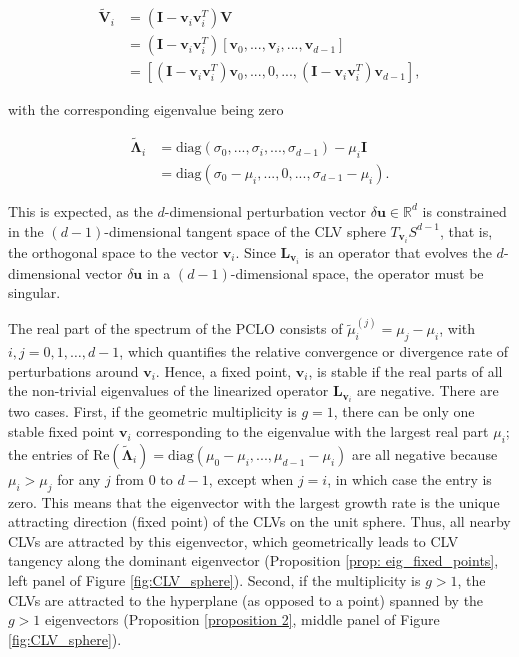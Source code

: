 \documentclass[aps,reprint,prx]{revtex4-2}
\begin{document}
\begin{align}
\tilde{\mathbf{V}}_i &= \left(\mathbf{I} - \mathbf{v}_i\mathbf{v}_i^T\right)\mathbf{V} \nonumber\\
&= \left(\mathbf{I} - \mathbf{v}_i\mathbf{v}_i^T\right)[\mathbf{v}_0, ..., \mathbf{v}_i,...,\mathbf{v}_{d-1}] \nonumber\\
&= [\left(\mathbf{I} - \mathbf{v}_i\mathbf{v}_i^T\right)\mathbf{v}_0, ..., 0, ..., \left(\mathbf{I} - \mathbf{v}_i\mathbf{v}_i^T\right)\mathbf{v}_{d-1}],
\end{align}

with the corresponding eigenvalue being zero

\begin{align} \label{eigenvalue_PCLO}
\tilde{\mathbf{\Lambda}}_i &= \text{diag}\left(\sigma_0, ...,\sigma_i, ..., \sigma_{d-1} \right) - \mu_i\mathbf{I} \nonumber\\ &= \text{diag}\left(\sigma_0 - \mu_i, ..., 0, ..., \sigma_{d-1} - \mu_i \right).
\end{align}

This is expected, as the $d$-dimensional perturbation vector $\delta \mathbf{u} \in \mathbb{R}^d$ is constrained in the $(d-1)$-dimensional tangent space of the CLV sphere $T_{\mathbf{v}_i}S^{d-1}$, that is, the orthogonal space to the vector $\mathbf{v}_i$. Since $\mathbf{L}_{\mathbf{v}_i}$ is an operator that evolves the $d$-dimensional vector $\delta \mathbf{u}$ in a $(d-1)$-dimensional space, the operator must be singular.

The {real part of the spectrum} of the PCLO consists of $\tilde{\mu}_i^{(j)} = \mu_j - \mu_i$, with $i,j=0,1,\ldots,d-1$, which quantifies the {relative convergence or divergence rate of perturbations around $\mathbf{v}_i$}. Hence, a fixed point, $\mathbf{v}_i$, is stable if the {real parts of all the non-trivial eigenvalues} of the linearized operator $\mathbf{L}_{\mathbf{v}_i}$ are negative. There are two cases. First, if the geometric multiplicity is $g=1$, there can be only one stable fixed point $\mathbf{v}_i$ corresponding to the {eigenvalue with the largest real part $\mu_i$}; the entries of $\mathrm{Re}(\tilde{\mathbf{\Lambda}}_i) = \text{diag}(\mu_0 - \mu_i, ..., \mu_{d-1}-\mu_i)$ are all negative because $\mu_i > \mu_j$ for any $j$ from $0$ to $d-1$, except when $j=i$, in which case the entry is zero. This means that the eigenvector with the largest growth rate is the unique attracting direction (fixed point) of the CLVs on the unit sphere. Thus, all nearby CLVs are attracted by this eigenvector, which geometrically leads to CLV tangency along the dominant eigenvector (Proposition \ref{prop: eig_fixed_points}, left panel of Figure \ref{fig:CLV_sphere}).
Second, if the multiplicity is $g > 1$, the CLVs are attracted to the hyperplane (as opposed to a point) spanned by the $g > 1$ eigenvectors (Proposition \ref{proposition 2}, middle panel of Figure \ref{fig:CLV_sphere}).
\end{document}
